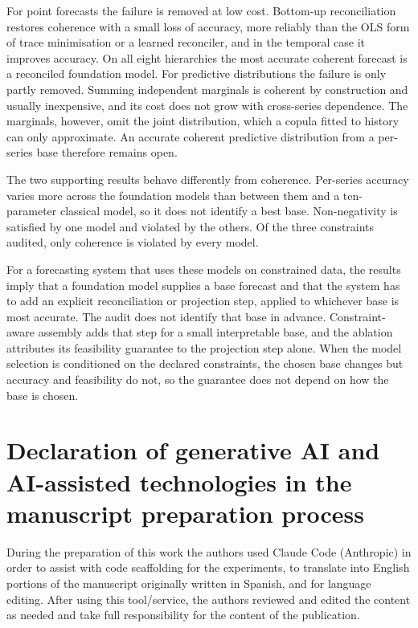 \documentclass[review,number]{elsarticle}
\begin{document}
For point forecasts the failure is removed at low cost. Bottom-up reconciliation restores
coherence with a small loss of accuracy, more reliably than the OLS form of trace
minimisation or a learned reconciler, and in the temporal case it improves accuracy. On
all eight hierarchies the most accurate coherent forecast is a reconciled foundation
model. For predictive distributions the failure is only partly removed. Summing
independent marginals is coherent by construction and usually inexpensive, and its cost
does not grow with cross-series dependence. The marginals, however, omit the joint
distribution, which a copula fitted to history can only approximate. An accurate
coherent predictive distribution from a per-series base therefore remains open.

The two supporting results behave differently from coherence. Per-series accuracy varies
more across the foundation models than between them and a ten-parameter classical model,
so it does not identify a best base. Non-negativity is satisfied by one model and
violated by the others. Of the three constraints audited, only coherence is violated by
every model.

For a forecasting system that uses these models on constrained data, the results imply
that a foundation model supplies a base forecast and that the system has to add an
explicit reconciliation or projection step, applied to whichever base is most accurate.
The audit does not identify that base in advance. Constraint-aware
assembly adds that step for a small interpretable base, and the ablation attributes its
feasibility guarantee to the projection step alone. When the model selection is
conditioned on the declared constraints, the chosen base changes but accuracy and
feasibility do not, so the guarantee does not depend on how the base is chosen.

\section*{Declaration of generative AI and AI-assisted technologies in the manuscript preparation process}
During the preparation of this work the authors used Claude Code (Anthropic) in
order to assist with code scaffolding for the experiments, to translate into English
portions of the manuscript originally written in Spanish, and for language editing.
After using this tool/service, the authors reviewed and edited
the content as needed and take full responsibility for the content of the
publication.
\end{document}
